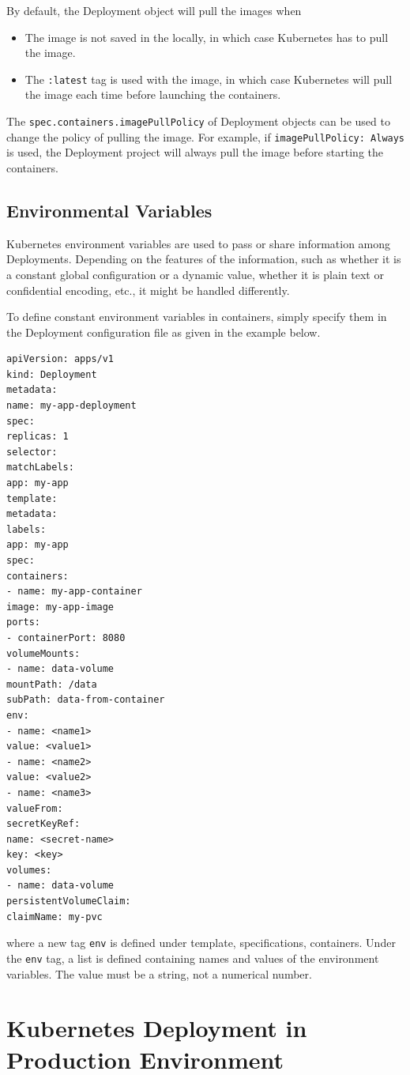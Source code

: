 By default, the Deployment object will pull the images when
\begin{itemize}
  \item The image is not saved in the locally, in which case Kubernetes has to pull the image.
  \item The \verb|:latest| tag is used with the image, in which case Kubernetes will pull the image each time before launching the containers.
\end{itemize}
The \texttt{spec.containers.imagePullPolicy} of Deployment objects can be used to change the policy of pulling the image. For example, if \texttt{imagePullPolicy: Always} is used, the Deployment project will always pull the image before starting the containers.

\subsection{Environmental Variables}

Kubernetes environment variables are used to pass or share information among Deployments. Depending on the features of the information, such as whether it is a constant global configuration or a dynamic value, whether it is plain text or confidential encoding, etc., it might be handled differently.

To define constant environment variables in containers, simply specify them in the Deployment configuration file as given in the example below.

\begin{lstlisting}
apiVersion: apps/v1
kind: Deployment
metadata:
name: my-app-deployment
spec:
replicas: 1
selector:
matchLabels:
app: my-app
template:
metadata:
labels:
app: my-app
spec:
containers:
- name: my-app-container
image: my-app-image
ports:
- containerPort: 8080
volumeMounts:
- name: data-volume
mountPath: /data
subPath: data-from-container
env:
- name: <name1>
value: <value1>
- name: <name2>
value: <value2>
- name: <name3>
valueFrom:
secretKeyRef:
name: <secret-name>
key: <key>
volumes:
- name: data-volume
persistentVolumeClaim:
claimName: my-pvc
\end{lstlisting}
where a new tag \verb|env| is defined under template, specifications, containers. Under the \verb|env| tag, a list is defined containing names and values of the environment variables. The value must be a string, not a numerical number.

\section{Kubernetes Deployment in Production Environment}

